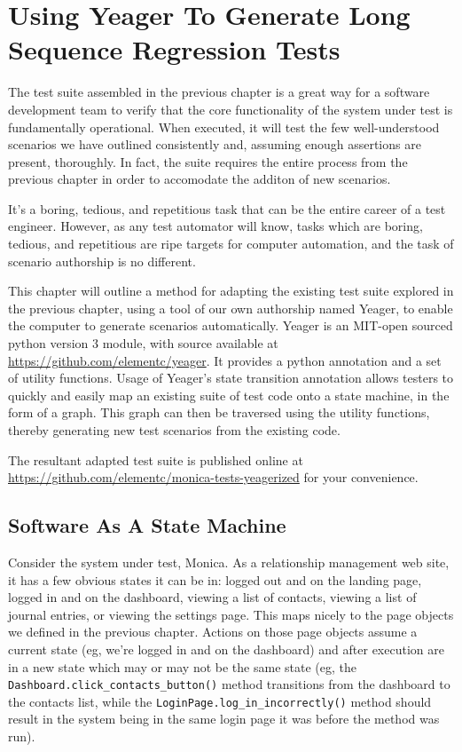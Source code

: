 \chapter{Using Yeager To Generate Long Sequence Regression Tests}
The test suite assembled in the previous chapter is a great way for a software development team to verify that the core functionality of the system under test is fundamentally operational. When executed, it will test the few well-understood scenarios we have outlined consistently and, assuming enough assertions are present, thoroughly. In fact, the suite requires the entire process from the previous chapter in order to accomodate the additon of new scenarios.

It's a boring, tedious, and repetitious task that can be the entire career of a test engineer. However, as any test automator will know, tasks which are boring, tedious, and repetitious are ripe targets for computer automation, and the task of scenario authorship is no different.

This chapter will outline a method for adapting the existing test suite explored in the previous chapter, using a tool of our own authorship named Yeager, to enable the computer to generate scenarios automatically. Yeager is an MIT-open sourced python version 3 module, with source available at \url{https://github.com/elementc/yeager}. It provides a python annotation and a set of utility functions. Usage of Yeager's state transition annotation allows testers to quickly and easily map an existing suite of test code onto a state machine, in the form of a graph. This graph can then be traversed using the utility functions, thereby generating new test scenarios from the existing code.

The resultant adapted test suite is published online at \url{https://github.com/elementc/monica-tests-yeagerized} for your convenience.

\section{Software As A State Machine}
Consider the system under test, Monica. As a relationship management web site, it has a few obvious states it can be in: logged out and on the landing page, logged in and on the dashboard, viewing a list of contacts, viewing a list of journal entries, or viewing the settings page. This maps nicely to the page objects we defined in the previous chapter. Actions on those page objects assume a current state (eg, we're logged in and on the dashboard) and after execution are in a new state which may or may not be the same state (eg, the \texttt{Dashboard.click\_contacts\_button()} method transitions from the dashboard to the contacts list, while the \texttt{LoginPage.log\_in\_incorrectly()} method should result in the system being in the same login page it was before the method was run).

